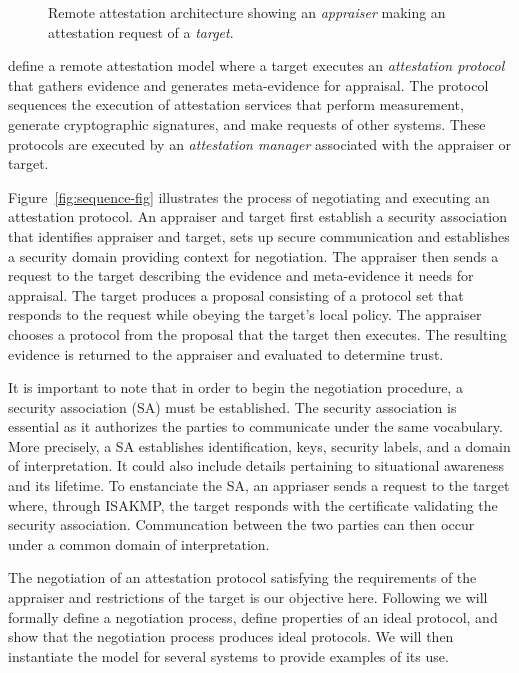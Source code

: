 \documentclass[sigconf,authordraft]{acmart}
\begin{document}
\begin{figure}[hbtp]
  \centering 
  \caption[Attestation architecture]{Remote attestation architecture
    showing an \emph{appraiser} making an attestation request of a
    \emph{target}.}
  \label{fig:architecture-fig}
\end{figure}

\citet{Coker::Principles-of-R,Coker:08:Attestation:-Ev} define a
remote attestation model where a target executes an \emph{attestation
  protocol} that gathers evidence and generates meta-evidence for
appraisal.  The protocol sequences the execution of attestation
services that perform measurement, generate cryptographic signatures,
and make requests of other systems. These protocols are executed by an
\emph{attestation manager} associated with the appraiser or target.

Figure~\ref{fig:sequence-fig} illustrates the process of negotiating
and executing an attestation protocol.  An appraiser and target first
establish a security association that identifies appraiser and target,
sets up secure communication and establishes a security domain
providing context for negotiation.  The appraiser then sends a request
to the target describing the evidence and meta-evidence it needs for
appraisal.  The target produces a proposal consisting of a protocol
set that responds to the request while obeying the target's local
policy.  The appraiser chooses a protocol from the proposal that the
target then executes.  The resulting evidence is returned to the
appraiser and evaluated to determine trust.


It is important to note that in order to begin the negotiation
procedure, a security association (SA) must be established. The
security association is essential as it authorizes the parties to
communicate under the same vocabulary. More precisely, a SA
establishes identification, keys, security labels, and a domain of
interpretation. It could also include details pertaining to
situational awareness and its lifetime. To enstanciate the SA, an
appriaser sends a request to the target where, through ISAKMP, the
target responds with the certificate validating the security
association. Communcation between the two parties can then occur under
a common domain of interpretation.

The negotiation of an attestation protocol satisfying the requirements
of the appraiser and restrictions of the target is our objective here.
Following we will formally define a negotiation process, define
properties of an ideal protocol, and show that the negotiation process
produces ideal protocols.  We will then instantiate the model for
several systems to provide examples of its use.
\end{document}
